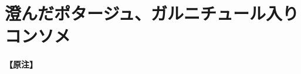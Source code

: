 \href{原稿下準備}{} \href{未、原文対照チェック}{}
\href{未、日本語表現校正}{} \href{未、その他修正}{}
\href{未、原稿最終校正}{}

\hypertarget{ux6f84ux3093ux3060ux30ddux30bfux30fcux30b8ux30e5ux30acux30ebux30cbux30c1ux30e5ux30fcux30ebux5165ux308aux30b3ux30f3ux30bdux30e1}{%
\section{澄んだポタージュ、ガルニチュール入りコンソメ}\label{ux6f84ux3093ux3060ux30ddux30bfux30fcux30b8ux30e5ux30acux30ebux30cbux30c1ux30e5ux30fcux30ebux5165ux308aux30b3ux30f3ux30bdux30e1}}



\hypertarget{ux539fux6ce8}{%
\paragraph{【原注】}\label{ux539fux6ce8}}

\href{コメント\ldots{}\ldots{}この部分は無視してください。この下からスタートしてください。}{}

\href{注記\ldots{}\ldots{}見出し語の後は半角スペースを空けて\%20\%7B\#れしぴ名をすべて小文字アクサンなしでハイフンでつないでください\%7D}{}

\href{注記\ldots{}\ldots{}フランス語の見出しは原則単数形でお願いします。また、@の前つまりソート用よみがなはアクサンなし、すべて小文字でお願いします}{}


